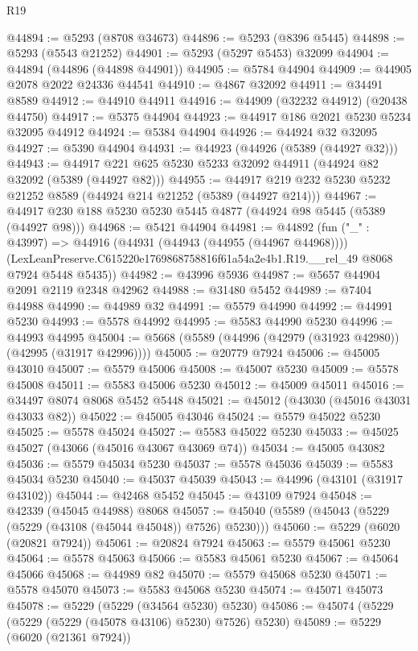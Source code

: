 \begin{lexlean}{R19}
\begin{coremodule}
@44894 := @5293 (@8708 @34673)
@44896 := @5293 (@8396 @5445)
@44898 := @5293 (@5543 @21252)
@44901 := @5293 (@5297 @5453) @32099
@44904 := @44894 (@44896 (@44898 @44901))
@44905 := @5784 @44904
@44909 := @44905 @2078 @2022 @24336 @44541
@44910 := @4867 @32092
@44911 := @34491 @8589
@44912 := @44910 @44911
@44916 := @44909 (@32232 @44912) (@20438 @44750)
@44917 := @5375 @44904
@44923 := @44917 @186 @2021 @5230 @5234 @32095 @44912
@44924 := @5384 @44904
@44926 := @44924 @32 @32095
@44927 := @5390 @44904
@44931 := @44923 (@44926 (@5389 (@44927 @32)))
@44943 := @44917 @221 @625 @5230 @5233 @32092 @44911 (@44924 @82 @32092 (@5389 (@44927 @82)))
@44955 := @44917 @219 @232 @5230 @5232 @21252 @8589 (@44924 @214 @21252 (@5389 (@44927 @214)))
@44967 := @44917 @230 @188 @5230 @5230 @5445 @4877 (@44924 @98 @5445 (@5389 (@44927 @98)))
@44968 := @5421 @44904
@44981 := @44892
    (fun ("_" : @43997) =>
    @44916
      (@44931 (@44943 (@44955 (@44967 @44968))))
      (LexLeanPreserve.C615220e1769868758816f61a54a2e4b1.R19.__rel_49 @8068 @7924 @5448 @5435))
@44982 := @43996 @5936
@44987 := @5657 @44904 @2091 @2119 @2348 @42962
@44988 := @31480 @5452
@44989 := @7404 @44988
@44990 := @44989 @32
@44991 := @5579 @44990
@44992 := @44991 @5230
@44993 := @5578 @44992
@44995 := @5583 @44990 @5230
@44996 := @44993 @44995
@45004 := @5668 (@5589 (@44996 (@42979 (@31923 @42980)) (@42995 (@31917 @42996))))
@45005 := @20779 @7924
@45006 := @45005 @43010
@45007 := @5579 @45006
@45008 := @45007 @5230
@45009 := @5578 @45008
@45011 := @5583 @45006 @5230
@45012 := @45009 @45011
@45016 := @34497 @8074 @8068 @5452 @5448
@45021 := @45012 (@43030 (@45016 @43031 @43033 @82))
@45022 := @45005 @43046
@45024 := @5579 @45022 @5230
@45025 := @5578 @45024
@45027 := @5583 @45022 @5230
@45033 := @45025 @45027 (@43066 (@45016 @43067 @43069 @74))
@45034 := @45005 @43082
@45036 := @5579 @45034 @5230
@45037 := @5578 @45036
@45039 := @5583 @45034 @5230
@45040 := @45037 @45039
@45043 := @44996 (@43101 (@31917 @43102))
@45044 := @42468 @5452
@45045 := @43109 @7924
@45048 := @42339 (@45045 @44988) @8068
@45057 := @45040 (@5589 (@45043 (@5229 (@5229 (@43108 (@45044 @45048)) @7526) @5230)))
@45060 := @5229 (@6020 (@20821 @7924))
@45061 := @20824 @7924
@45063 := @5579 @45061 @5230
@45064 := @5578 @45063
@45066 := @5583 @45061 @5230
@45067 := @45064 @45066
@45068 := @44989 @82
@45070 := @5579 @45068 @5230
@45071 := @5578 @45070
@45073 := @5583 @45068 @5230
@45074 := @45071 @45073
@45078 := @5229 (@5229 (@34564 @5230) @5230)
@45086 := @45074 (@5229 (@5229 (@5229 (@45078 @43106) @5230) @7526) @5230)
@45089 := @5229 (@6020 (@21361 @7924))

\end{coremodule}
\end{lexlean}
